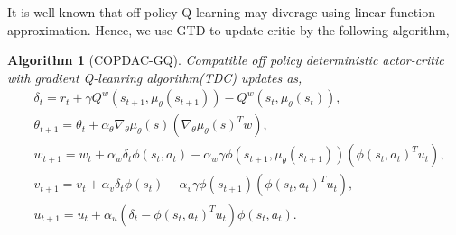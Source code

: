 \documentclass[11pt,a4paper]{article}
\newtheorem{algorithm}{Algorithm}[subsection]
\begin{document}
It is well-known that off-policy Q-learning may diverage using linear function approximation. Hence, we use GTD to update critic by the following algorithm,
\begin{algorithm}[COPDAC-GQ]
Compatible off policy deterministic actor-critic with gradient Q-leanring algorithm(TDC) updates as,
\begin{align}
& \delta_t = r_t + \gamma Q^w(s_{t+1},\mu_{\theta}(s_{t+1}))-Q^w(s_t,\mu_{\theta}(s_t)), \\ 
& \theta_{t+1} = \theta_t + \alpha_{\theta} \nabla_{\theta}\mu_{\theta}(s)(\nabla_{\theta}\mu_{\theta}(s)^Tw), \\
& w_{t+1} = w_t + \alpha_w \delta_t \phi(s_t,a_t)-\alpha_w \gamma \phi(s_{t+1},\mu_{\theta}(s_{t+1}))(\phi(s_t,a_t)^Tu_t), \\ 
& v_{t+1} = v_t + \alpha_v \delta_t \phi(s_t) - \alpha_v \gamma \phi(s_{t+1})(\phi(s_t,a_t)^Tu_t), \\ 
& u_{t+1} = u_t + \alpha_u(\delta_t - \phi(s_t,a_t)^Tu_t)\phi(s_t,a_t). 
\end{align}
\end{algorithm}
\end{document}
